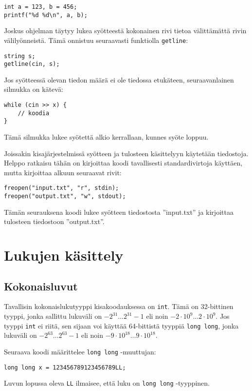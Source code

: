 \begin{lstlisting}
int a = 123, b = 456;
printf("%d %d\n", a, b);
\end{lstlisting}

Joskus ohjelman täytyy lukea syötteestä
kokonainen rivi tietoa
välittämättä rivin välilyönneistä.
Tämä onnistuu seuraavasti funktiolla
\texttt{getline}:

\begin{lstlisting}
string s;
getline(cin, s);
\end{lstlisting}

Jos syötteessä olevan tiedon määrä ei ole tiedossa
etukäteen, seuraavanlainen silmukka on kätevä:

\begin{lstlisting}
while (cin >> x) {
    // koodia
}
\end{lstlisting}

Tämä silmukka lukee syötettä alkio
kerrallaan, kunnes syöte loppuu.

Joissakin kisajärjestelmissä syötteen ja tulosteen
käsittelyyn käytetään tiedostoja. Helppo ratkaisu tähän
on kirjoittaa koodi tavallisesti
standardivirtoja käyttäen,
mutta kirjoittaa alkuun seuraavat rivit:

\begin{lstlisting}
freopen("input.txt", "r", stdin);
freopen("output.txt", "w", stdout);
\end{lstlisting}
Tämän seurauksena koodi lukee syötteen tiedostosta
''input.txt'' ja kirjoittaa tulosteen
tiedostoon ''output.txt''.

\section{Lukujen käsittely}

\subsection{Kokonaisluvut}

Tavallisin kokonaislukutyyppi kisakoodauksessa on \texttt{int}.
Tämä on 32-bittinen tyyppi,
jonka sallittu lukuväli on $-2^{31} \ldots 2^{31}-1$
eli noin $-2 \cdot 10^9 \ldots 2 \cdot 10^9$.
Jos tyyppi \texttt{int} ei riitä, sen sijaan voi käyttää
64-bittistä tyyppiä
\texttt{long long}, jonka lukuväli on $-2^{63} \ldots 2^{63}-1$
eli noin $-9 \cdot 10^{18} \ldots 9 \cdot 10^{18}$.

Seuraava koodi määrittelee
\texttt{long long} -muuttujan:

\begin{lstlisting}
long long x = 123456789123456789LL;
\end{lstlisting}
Luvun lopussa oleva \texttt{LL}
ilmaisee, että luku on \texttt{long long} -tyyppinen.

